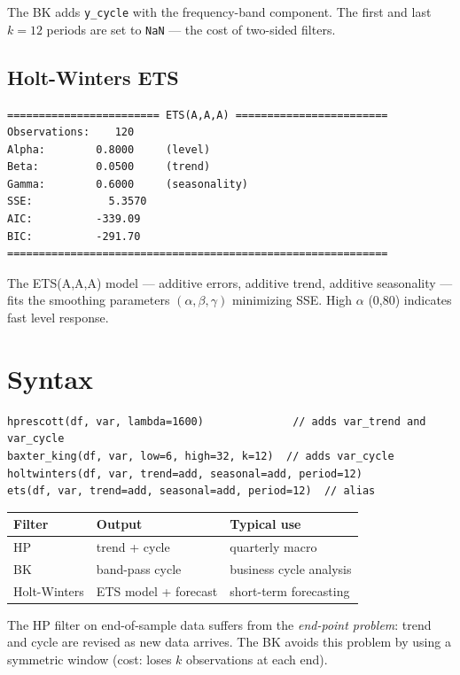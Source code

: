 The BK adds \texttt{y\_cycle} with the frequency-band component.
The first and last $k = 12$ periods are set to \texttt{NaN} — the cost
of two-sided filters.

\subsection*{Holt-Winters ETS}

\begin{lstlisting}[language={}, basicstyle=\ttfamily\small,
  frame=none, numbers=none, backgroundcolor=\color{codbg},
  xleftmargin=0pt, xrightmargin=0pt, breaklines=false]
======================== ETS(A,A,A) ========================
Observations:    120
Alpha:        0.8000     (level)
Beta:         0.0500     (trend)
Gamma:        0.6000     (seasonality)
SSE:            5.3570
AIC:          -339.09
BIC:          -291.70
============================================================
\end{lstlisting}

The ETS(A,A,A) model — additive errors, additive trend, additive seasonality —
fits the smoothing parameters $(\alpha, \beta, \gamma)$
minimizing SSE. High $\alpha$ (0{,}80) indicates fast level response.

\section{Syntax}

\begin{lstlisting}
hprescott(df, var, lambda=1600)              // adds var_trend and var_cycle
baxter_king(df, var, low=6, high=32, k=12)  // adds var_cycle
holtwinters(df, var, trend=add, seasonal=add, period=12)
ets(df, var, trend=add, seasonal=add, period=12)  // alias
\end{lstlisting}

\begin{center}
\begin{tabular}{lll}
\toprule
\textbf{Filter} & \textbf{Output} & \textbf{Typical use} \\
\midrule
HP              & trend + cycle         & quarterly macro \\
BK              & band-pass cycle       & business cycle analysis \\
Holt-Winters    & ETS model + forecast  & short-term forecasting \\
\bottomrule
\end{tabular}
\end{center}

\begin{nota}
  The HP filter on end-of-sample data suffers from the
  \emph{end-point problem}: trend and cycle are revised as new
  data arrives. The BK avoids this problem by using a symmetric window
  (cost: loses $k$ observations at each end).
\end{nota}

